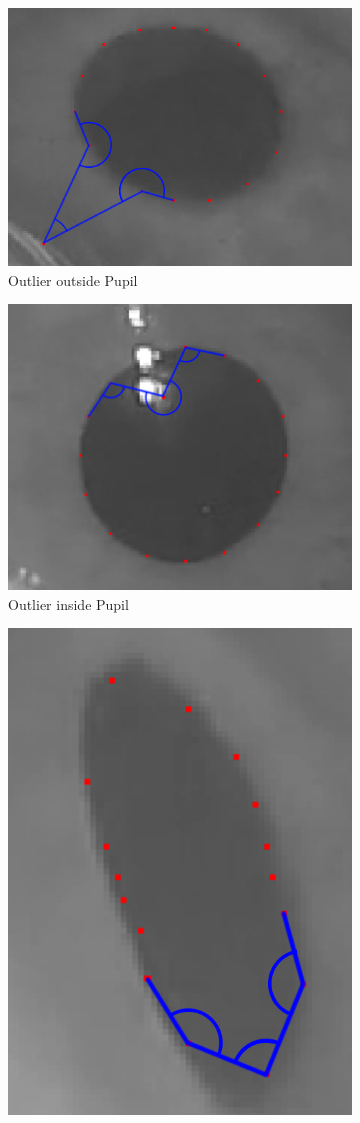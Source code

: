 \begin{figure}[H]
\begin{subfigure}{.33\textwidth}
	\centering
	\includegraphics[width=.8\linewidth]{images/angle.png}
	\caption{Outlier outside Pupil}
	\label{fig:outlierOutside}
\end{subfigure}%
\begin{subfigure}{.33\textwidth}
	\centering
	\includegraphics[width=.8\linewidth]{images/outlier_inner.png}
	\caption{Outlier inside Pupil}
	\label{fig:outlierInside}
\end{subfigure}
\begin{subfigure}{.33\textwidth}
	\centering
	\includegraphics[width=.6\linewidth]{images/non_outlier.png}

\end{subfigure}
\end{figure}
